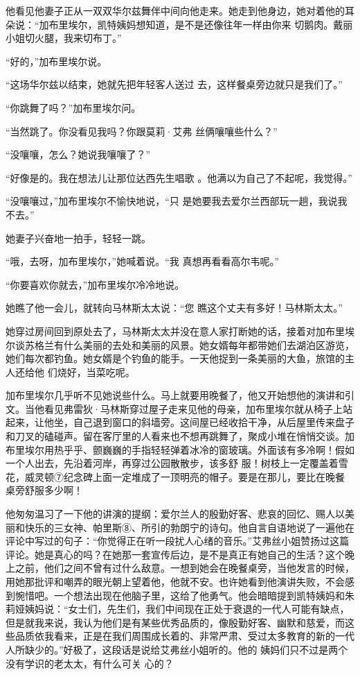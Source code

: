 \documentclass{article}
\begin{document}
他看见他妻子正从一双双华尔兹舞伴中间向他走来。她走到他身边，她对着他的耳朵说：“加布里埃尔，凯特姨妈想知道，是不是还像往年一样由你来
切鹅肉。戴丽小姐切火腿，我来切布丁。” 


“好的，”加布里埃尔说。 

\newpage

“这场华尔兹以结束，她就先把年轻客人送过
去，这样餐桌旁边就只是我们了。” 


“你跳舞了吗？”加布里埃尔问。 

“当然跳了。你没看见我吗？你跟莫莉·艾弗
丝俩嚷嚷些什么？” 


“没嚷嚷，怎么？她说我嚷嚷了？” 

“好像是的。我在想法儿让那位达西先生唱歌
。他满以为自己了不起呢，我觉得。” 

“没嚷嚷过，”加布里埃尔不愉快地说，“只
是她要我去爱尔兰西部玩一趟，我说我不去。” 


她妻子兴奋地一拍手，轻轻一跳。 

“哦，去呀，加布里埃尔，”她喊着说。“我
真想再看看高尔韦呢。” 

\newpage

“你要喜欢你就去，”加布里埃尔冷冷地说。

她瞧了他一会儿，就转向马林斯太太说：“您
瞧这个丈夫有多好！马林斯太太。” 

她穿过房间回到原处去了，马林斯太太并没在意人家打断她的话，接着对加布里埃尔谈苏格兰有什么美丽的去处和美丽的风景。她女婿每年都带她们去湖泊区游览，她们每次都钓鱼。她女婿是个钓鱼的能手。一天他捉到一条美丽的大鱼，旅馆的主人还给他
们烧好，当菜吃呢。 

加布里埃尔几乎听不见她说些什么。马上就要用晚餐了，他又开始想他的演讲和引文。当他看见弗雷狄·马林斯穿过屋子走来见他的母亲，加布里埃尔就从椅子上站起来，让他坐，自己退到窗口的斜墙旁。这间屋已经收拾干净，从后屋里传来盘子和刀叉的磕碰声。留在客厅里的人看来也不想再跳舞了，聚成小堆在悄悄交谈。加布里埃尔用热乎乎、颤巍巍的手指轻轻弹着冰冷的窗玻璃。外面该有多冷啊！假如一个人出去，先沿着河岸，再穿过公园散散步，该多舒
\newpage
服！树枝上一定覆盖着雪花，威灵顿⑦纪念碑上面一定堆成了一顶明亮的帽子。要是在那儿，要比在晚餐
桌旁舒服多少啊！ 

他匆匆温习了一下他的讲演的提纲：爱尔兰人的殷勤好客、悲哀的回忆、赐人以美丽和快乐的三女神、帕里斯⑧、所引的勃朗宁的诗句。他自言自语地说了一遍他在评论中写过的句子：“你觉得正在听一段扰人心绪的音乐。”艾弗丝小姐赞扬过这篇评论。她是真心的吗？在她那一套宣传后边，是不是真正有她自己的生活？这个晚上之前，他们之间不曾有过什么敌意。一想到她会在晚餐桌旁，当他发言的时候，用她那批评和嘲弄的眼光朝上望着他，他就不安。也许她看到他演讲失败，不会感到惋惜吧。一个想法出现在他脑子里，这给了他勇气。他会暗暗提到凯特姨妈和朱莉娅姨妈说：“女士们，先生们，我们中间现在正处于衰退的一代人可能有缺点，但是就我来说，我认为他们是有某些优秀品质的，像殷勤好客、幽默和慈爱，而这些品质依我看来，正是在我们周围成长着的、非常严肃、受过太多教育的新的一代人所缺少的。”好极了，这段话是说给艾弗丝小姐听的。他的
\newpage
姨妈们只不过是两个没有学识的老太太，有什么可关
心的？ 
\end{document}
